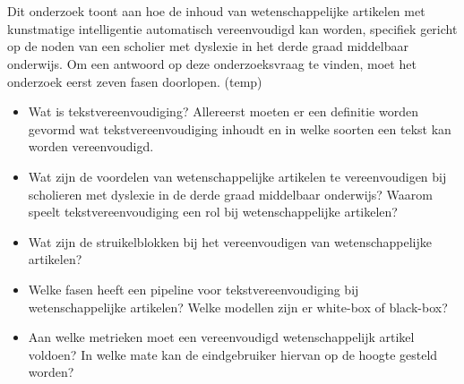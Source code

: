 \section{}%
\label{sec:onderzoeksvraag}


Dit onderzoek toont aan hoe de inhoud van wetenschappelijke artikelen met kunstmatige intelligentie automatisch vereenvoudigd kan worden, specifiek gericht op de noden van een scholier met dyslexie in het derde graad middelbaar onderwijs. Om een antwoord op deze onderzoeksvraag te vinden, moet het onderzoek eerst zeven fasen doorlopen. (temp)

\begin{itemize}
	\item Wat is tekstvereenvoudiging? Allereerst moeten er een definitie worden gevormd wat tekstvereenvoudiging inhoudt en in welke soorten een tekst kan worden vereenvoudigd. 
	\item Wat zijn de voordelen van wetenschappelijke artikelen te vereenvoudigen bij scholieren met dyslexie in de derde graad middelbaar onderwijs? Waarom speelt tekstvereenvoudiging een rol bij wetenschappelijke artikelen?
	\item Wat zijn de struikelblokken bij het vereenvoudigen van wetenschappelijke artikelen?
	\item Welke fasen heeft een pipeline voor tekstvereenvoudiging bij wetenschappelijke artikelen? Welke modellen zijn er white-box of black-box?
	\item Aan welke metrieken moet een vereenvoudigd wetenschappelijk artikel voldoen? In welke mate kan de eindgebruiker hiervan op de hoogte gesteld worden? 
\end{itemize}


\section{}%
\label{sec:onderzoeksdoelstelling}

